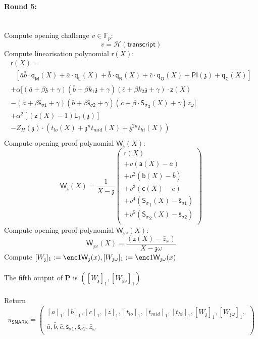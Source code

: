 \documentclass[11pt]{article} %
\newcommand{\F}{\ensuremath{\mathbb F}\xspace}
\newcommand{\chalpoint}{\ensuremath{\mathfrak{z}}\xspace}
\newcommand{\hash}{\ensuremath{\mathcal{H}}\xspace}
\newcommand{\prv}{\ensuremath{\mathsf{\mathbf{P}}}\xspace}
\newcommand{\sigpoly}{\ensuremath{\mathsf{S_{\sigma}}}\xspace}
\newcommand{\sigpolyevala}{\ensuremath{\mathsf{\bar{s}_{\sigma1}}}\xspace}
\newcommand{\sigpolyevalb}{\ensuremath{\mathsf{\bar{s}_{\sigma2}}}\xspace}
\newcommand{\pubinppoly}{\ensuremath{\mathsf{PI}}\xspace}
\newcommand{\lpoly}{\ensuremath{\mathsf{a}}\xspace}
\newcommand{\rpoly}{\ensuremath{\mathsf{b}}\xspace}
\newcommand{\opoly}{\ensuremath{\mathsf{c}}\xspace}
\newcommand{\idpermpoly}{\ensuremath{\mathsf{z}}\xspace}
\newcommand{\lagrangepoly}{\ensuremath{\mathsf{L}}\xspace}
\newcommand{\snark}{\ensuremath{\mathsf{snark}}\xspace}
\newcommand{\Prove}{\mathcal{P}}
\newcommand{\Psnark}{\prv}%
\newcommand{\transcript}{\ensuremath{\mathsf{transcript}}\xspace}
\begin{document}
	\paragraph{\textbf{Round 5:}}\ \\
	Compute opening challenge $v \in \F_p:$
	$$
	v = \hash(\transcript)
	$$
	Compute linearisation polynomial $\mathsf{r}(X):$
	$$
	\begin{array}{l}
	\mathsf{r}(X) = \\
	\ \ \ \left[ \bar{a} \bar{b} \cdot \mathsf{q_M}(X) + \bar{a} \cdot \mathsf{q_L}(X) + \bar{b} \cdot \mathsf{q_R}(X) + \bar{c} \cdot \mathsf{q_O}(X) + \pubinppoly(\chalpoint) + \mathsf{q_C}(X) \right] \\
	+ \alpha [ (\bar{a} + \beta \chalpoint + \gamma)(\bar{b} + \beta k_1 \chalpoint + \gamma)(\bar{c} + \beta k_2 \chalpoint + \gamma) \cdot \idpermpoly(X)\\ 
	- (\bar{a} + \beta \sigpolyevala + \gamma)(\bar{b} + \beta \sigpolyevalb + \gamma)(\bar{c} + \beta \cdot \sigpoly_3(X)+\gamma )\bar{z}_\omega ] \\
	+ \alpha^2 \left[( \idpermpoly(X) -1 ) \lagrangepoly_1(\chalpoint)\right] \\
	- Z_H(\chalpoint)\cdot(t_{lo}(X)+ \chalpoint ^n t_{mid}(X) + \chalpoint^{2n} t_{hi}(X))\\
	\end{array}
	$$
	Compute opening proof polynomial $\mathsf{W_\chalpoint}(X):$
	$$
	\mathsf{W_\chalpoint}(X) = \frac{1}{X - \chalpoint} \left(
	\begin{array}{l}
	\mathsf{r}(X)  \\
	+ v(\lpoly(X) - \bar{a}) \\
	+ v^2(\rpoly(X) - \bar{b}) \\
	+ v^3(\opoly(X) - \bar{c}) \\
	+ v^4(\sigpoly_1(X) - \sigpolyevala) \\
	+ v^5(\sigpoly_2(X) - \sigpolyevalb) \\
	\end{array}
	\right)
	$$
	Compute opening proof polynomial $\mathsf{W_{\chalpoint\omega}}(X):$
	$$
	\mathsf{W_{\chalpoint \omega}}(X) = \frac{(\idpermpoly(X) - \bar{z}_\omega)}{X - \chalpoint \omega}
	$$
	Compute $[W_\chalpoint]_1 := \enc1{\mathsf{W_\chalpoint}(x)}, [W_{\chalpoint \omega}]_1 := \enc1{\mathsf{W_{\chalpoint \omega}}(x)}$ \\ \\

	The fifth output of $\Psnark$ is $([W_\chalpoint]_1, [W_{\chalpoint\omega}]_1)$
	\\ \\
	Return
	$$
	\pi_{\mathsf{SNARK}} = \left(
	\begin{array}{c}
	[a]_1, [b]_1, [c]_1, [z]_1, [t_{lo}]_1, [t_{mid}]_1, [t_{hi}]_1, [W_\chalpoint]_1, [W_{\chalpoint \omega}]_1, \\
	\bar{a}, \bar{b}, \bar{c}, \sigpolyevala, \sigpolyevalb,  \bar{z}_\omega \\
	\end{array}
	\right)
	$$
	
\end{document}
